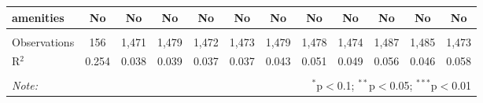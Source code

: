 \begin{table}[!htbp]
\begin{tabular}{@{\extracolsep{5pt}}lccccccccccc}
amenities & No & No & No & No & No & No & No & No & No & No & No \\ 
\hline \\[-1.8ex] 
Observations & 156 & 1,471 & 1,479 & 1,472 & 1,473 & 1,479 & 1,478 & 1,474 & 1,487 & 1,485 & 1,473 \\ 
R$^{2}$ & 0.254 & 0.038 & 0.039 & 0.037 & 0.037 & 0.043 & 0.051 & 0.049 & 0.056 & 0.046 & 0.058 \\ 
\hline 
\hline \\[-1.8ex] 
\textit{Note:}  & \multicolumn{11}{r}{$^{*}$p$<$0.1; $^{**}$p$<$0.05; $^{***}$p$<$0.01} \\ 
\end{tabular} 
\end{table} 
